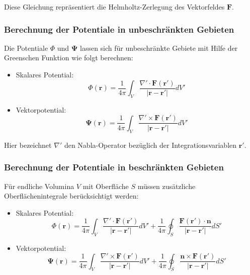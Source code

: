\noindent Diese Gleichung repräsentiert die Helmholtz-Zerlegung des Vektorfeldes $\mathbf{F}$.

\subsubsection{Berechnung der Potentiale in unbeschränkten Gebieten}

Die Potentiale $\Phi$ und $\mathbf{\Psi}$ lassen sich für unbeschränkte Gebiete mit Hilfe der Greenschen Funktion wie folgt berechnen:

\begin{itemize}
\item Skalares Potential:
\begin{equation}
\Phi(\mathbf{r}) = \frac{1}{4 \pi} \int_{V} \frac{\nabla' \cdot \mathbf{F}(\mathbf{r'})}{|\mathbf{r} - \mathbf{r'}|} dV'
\end{equation}

\item Vektorpotential:
\begin{equation}
\mathbf{\Psi}(\mathbf{r}) = \frac{1}{4 \pi} \int_{V} \frac{\nabla' \times \mathbf{F}(\mathbf{r'})}{|\mathbf{r} - \mathbf{r'}|} dV'
\end{equation}
\end{itemize}

\noindent Hier bezeichnet $\nabla'$ den Nabla-Operator bezüglich der Integrationsvariablen $\mathbf{r'}$.

\subsubsection{Berechnung der Potentiale in beschränkten Gebieten}

Für endliche Volumina $V$ mit Oberfläche $S$ müssen zusätzliche Oberflächenintegrale berücksichtigt werden:

\begin{itemize}
\item Skalares Potential:
\begin{equation}
\Phi (\mathbf{r}) = \frac{1}{4\pi} \int_V \frac{\nabla' \cdot \mathbf{F}(\mathbf{r}')}{|\mathbf{r} - \mathbf{r}'|} dV' + \frac{1}{4\pi} \oint_S \frac{\mathbf{F}(\mathbf{r}') \cdot \mathbf{n}}{|\mathbf{r} - \mathbf{r}'|} dS'
\end{equation}

\item Vektorpotential:
\begin{equation}
\mathbf{\Psi}(\mathbf{r}) = \frac{1}{4\pi} \int_V \frac{\nabla' \times \mathbf{F}(\mathbf{r}')}{|\mathbf{r} - \mathbf{r}'|} dV' + \frac{1}{4\pi} \oint_S \frac{\mathbf{n} \times \mathbf{F}(\mathbf{r}')}{|\mathbf{r} - \mathbf{r}'|} dS'
\end{equation}
\end{itemize}

